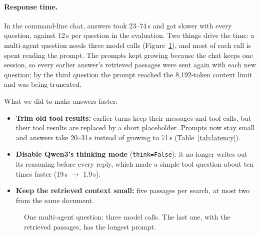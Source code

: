 \documentclass[10pt,a4paper]{article}
\newcommand{\code}[1]{\texttt{\small #1}}
\begin{document}
\paragraph{Response time.} In the command-line chat, answers took 23--74\,s and got slower with every question,
against 12\,s per question in the evaluation. Two things drive the time: a multi-agent question needs three model
calls (Figure~\ref{fig:sequence}), and most of each call is spent reading the prompt. The prompts kept growing because
the chat keeps one session, so every earlier answer's retrieved passages were sent again with each new question; by
the third question the prompt reached the 8{,}192-token context limit and was being truncated.

What we did to make answers faster:
\begin{itemize}
\item \textbf{Trim old tool results:} earlier turns keep their messages and tool calls, but their tool results are
  replaced by a short placeholder. Prompts now stay small and answers take 20--31\,s instead of growing to 71\,s
  (Table~\ref{tab:latency}).
\item \textbf{Disable Qwen3's thinking mode} (\code{think=False}): it no longer writes out its reasoning before every
  reply, which made a simple tool question about ten times faster (19\,s $\rightarrow$ 1.9\,s).
\item \textbf{Keep the retrieved context small:} five passages per search, at most two from the same document.
\end{itemize}

\begin{figure}[H]
\centering
{}
\caption{One multi-agent question: three model calls. The last one, with the retrieved passages, has the longest prompt.}
\label{fig:sequence}
\end{figure}
\end{document}
